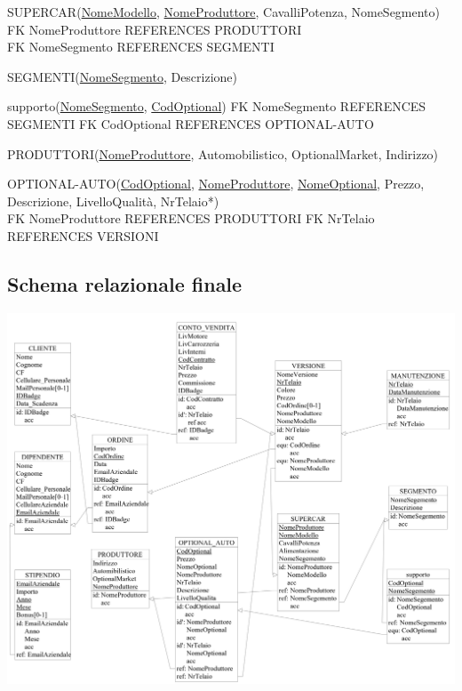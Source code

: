 \documentclass[11pt]{article}
\begin{document}
\begin{flushleft}
SUPERCAR(\underline{NomeModello}, \underline{NomeProduttore}, CavalliPotenza, NomeSegmento)\\
FK NomeProduttore REFERENCES PRODUTTORI\\
FK NomeSegmento REFERENCES SEGMENTI
\end{flushleft}

\begin{flushleft}
SEGMENTI(\underline{NomeSegmento}, Descrizione)
\end{flushleft}

\begin{flushleft}
supporto(\underline{NomeSegmento}, \underline{CodOptional})
FK NomeSegmento REFERENCES SEGMENTI
FK CodOptional REFERENCES OPTIONAL-AUTO
\end{flushleft}

\begin{flushleft}
PRODUTTORI(\underline{NomeProduttore}, Automobilistico, OptionalMarket, Indirizzo)
\end{flushleft}

\begin{flushleft}
OPTIONAL-AUTO(\underline{CodOptional}, \underline{NomeProduttore}, \underline{NomeOptional}, Prezzo, Descrizione, LivelloQualità, NrTelaio*)\\
FK NomeProduttore REFERENCES PRODUTTORI
FK NrTelaio REFERENCES VERSIONI
\end{flushleft}

\normalsize

\newpage 

\subsection{Schema relazionale finale}

\begin{center}
    \includegraphics[height=\linewidth, angle=90]{images/fullSchemes/relazionale.jpeg}
\end{center}
\end{document}
